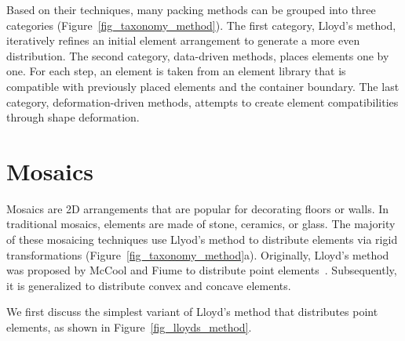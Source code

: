 \nnewtext
{
Based on their techniques, many packing methods can be grouped into three categories (Figure~\ref{fig_taxonomy_method}).
The first category, Lloyd's method, iteratively refines an initial element arrangement to generate a more even distribution.
The second category, data-driven methods, places elements one by one. For each step,
an element is taken from an element library that is compatible with previously placed elements and the container boundary.
The last category, deformation-driven methods, attempts to create element compatibilities through shape deformation.
}

\section{Mosaics}
\nnewtext
{
Mosaics are 2D arrangements that are popular for decorating floors or walls.
In traditional mosaics, elements are made of stone, ceramics, or glass.
The majority of these mosaicing techniques use Llyod's method to distribute elements
via rigid transformations (Figure~\ref{fig_taxonomy_method}a).
Originally, Lloyd's method was proposed by McCool and Fiume to distribute point elements~\cite{McCool1992}.
Subsequently, it is generalized to distribute convex and concave elements.
}

\nnewtext
{
We first discuss the simplest variant of Lloyd's method that distributes point elements, 
as shown in Figure~\ref{fig_lloyds_method}.}


